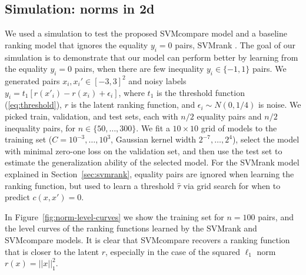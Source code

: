 \documentclass{article}
\newcommand{\RR}{\mathbb R}
\begin{document}
\subsection{Simulation: norms in 2d}

\begin{figure*}[b!]
  \centering
  
  \vskip -0.5cm
  \caption{Application to simulated patterns $x,x'\in\RR^2$, where the
    ranking functions $r(x)=||x||^2$ are squared norms (panels from
    left to right). \textbf{Top}: the training data are $n=100$ pairs,
    half equality (black segments indicate two points of equal rank),
    and half inequality (red arrows point to the higher
    rank). \textbf{Middle and bottom}: level curves of the ranking
    functions learned by SVMrank and SVMcompare. SVMrank ignores the
    equality pairs, so in general SVMcompare recovers the latent
    pattern better.}
  \label{fig:norm-level-curves}
\end{figure*}

We used a simulation to test the proposed SVMcompare model and a
baseline ranking model that ignores the equality $y_i=0$ pairs,
SVMrank \citep{ranksvm}. The goal of our simulation is to demonstrate
that our model can perform better by learning from the equality
$y_i=0$ pairs, when there are few inequality $y_i\in\{-1,1\}$
pairs. We generated pairs $x_i,x_i'\in[-3,3]^2$ and noisy labels
$y_i=t_1[r(x'_i)-r(x_i)+\epsilon_i]$, where $t_1$ is the threshold
function (\ref{eq:threshold}), $r$ is the latent ranking function, and
$\epsilon_i\sim N(0, 1/4)$ is noise. We picked train, validation, and
test sets, each with $n/2$ equality pairs and $n/2$ inequality pairs,
for $n\in\{50,\dots,300\}$. We fit a $10\times 10$ grid of models to
the training set ($C=10^{-3},\dots,10^3$, Gaussian kernel width
$2^{-7},\dots,2^4$), select the model with minimal zero-one loss on
the validation set, and then use the test set to estimate the
generalization ability of the selected model. For the SVMrank model
explained in Section~\ref{sec:svmrank}, equality pairs are ignored
when learning the ranking function, but used to learn a threshold
$\hat \tau$ via grid search for when to predict $c(x,x')=0$.

In Figure~\ref{fig:norm-level-curves} we show the training set for
$n=100$ pairs, and the level curves of the ranking functions learned
by the SVMrank and SVMcompare models. It is clear that SVMcompare
recovers a ranking function that is closer to the latent $r$,
especially in the case of the squared $\ell_1$ norm $r(x)=||x||_1^2$.
\end{document}
